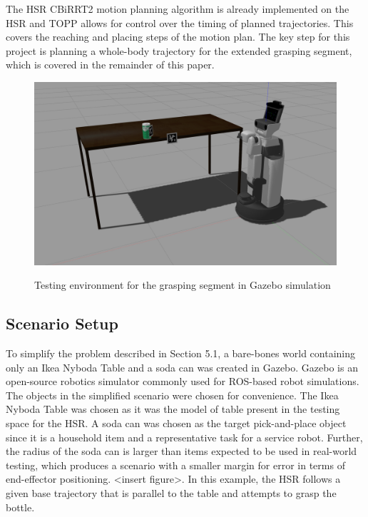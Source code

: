 \documentclass[12pt]{article}
\begin{document}
            The HSR CBiRRT2 motion planning algorithm is already implemented on the HSR and TOPP allows for control over the timing of planned trajectories. This covers the reaching and placing steps of the motion plan. The key step for this project is planning a whole-body trajectory for the extended grasping segment, which is covered in the remainder of this paper.
        
        \begin{figure}
            \centering
            \includegraphics[width=0.95\linewidth]{2020.05.19/setup.png}
            \label{fig:problem_setup}
            \caption{Testing environment for the grasping segment in Gazebo simulation}
        \end{figure}

        \subsection{Scenario Setup}
            To simplify the problem described in Section 5.1, a bare-bones world containing only an Ikea Nyboda Table and a soda can was created in Gazebo. Gazebo is an open-source robotics simulator commonly used for ROS-based robot simulations.\cite{koenig_design_2004} The objects in the simplified scenario were chosen for convenience. The Ikea Nyboda Table was chosen as it was the model of table present in the testing space for the HSR. A soda can was chosen as the target pick-and-place object since it is a household item and a representative task for a service robot. Further, the radius of the soda can is larger than items expected to be used in real-world testing, which produces a scenario with a smaller margin for error in terms of end-effector positioning. <insert figure>. In this example, the HSR follows a given base trajectory that is parallel to the table and attempts to grasp the bottle.
            
\end{document}
